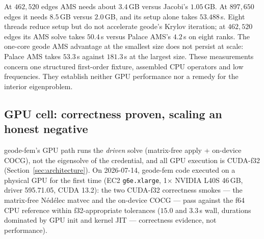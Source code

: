 \documentclass{anvil-paper}
\begin{document}
At $462{,}520$ edges AMS needs about $3.4$\,GB versus Jacobi's
$1.05$\,GB. At $897{,}650$ edges it needs $8.5$\,GB versus $2.0$\,GB,
and its setup alone takes $53.488$\,s. Eight threads reduce setup but
do not accelerate geode's Krylov iteration; at $462{,}520$ edges its
AMS solve takes $50.4$\,s versus Palace AMS's $4.2$\,s on eight ranks.
The one-core geode AMS advantage at the smallest size does not persist
at scale: Palace AMS takes $53.3$\,s against $181.3$\,s at the largest
size. These measurements concern one structured first-order fixture,
assembled CPU operators and low frequencies. They establish neither
GPU performance nor a remedy for the interior eigenproblem.

\subsection{GPU cell: correctness proven, scaling an honest negative}
\label{sec:perf-gpu}

geode-fem's GPU path runs the \emph{driven} solve (matrix-free
apply + on-device COCG), not the eigensolve of the credential, and all
GPU execution is CUDA-f32 (Section~\ref{sec:architecture}). On
2026-07-14, geode-fem code executed on a physical GPU for the first time
(EC2 \texttt{g6e.xlarge}, 1$\times$ NVIDIA L40S 46\,GB, driver
595.71.05, CUDA 13.2): the two CUDA-f32 correctness smokes --- the
matrix-free N\'ed\'elec matvec and the on-device COCG --- pass against
the f64 CPU reference within f32-appropriate tolerances ($15.0$ and
$3.3$\,s wall, durations dominated by GPU init and kernel JIT ---
correctness evidence, not performance).
\end{document}
